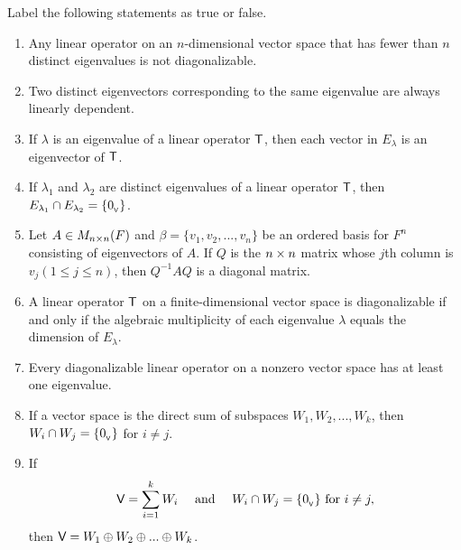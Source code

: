 \exercisesection

\begin{exercise} \label{exercise 5.2.1}
Label the following statements as true or false.
\begin{enumerate}
\item Any linear operator on an \(n\)-dimensional vector space that has fewer than \(n\) distinct eigenvalues is not diagonalizable.
\item Two distinct eigenvectors corresponding to the same eigenvalue are always linearly dependent.
\item If \(\lambda\) is an eigenvalue of a linear operator \(\textsf{T}\), then each vector in \(E_{\lambda}\) is an eigenvector of \(\textsf{T}\).
\item If \(\lambda_1\) and \(\lambda_2\) are distinct eigenvalues of a linear operator \(\textsf{T}\), then \(E_{\lambda_1} \cap E_{\lambda_2} = \{ 0_{_{\textsf{V}}} \}\).
\item Let \(A \in M_{n \times n}(F)\) and \(\beta = \{ v_1, v_2, ..., v_n \}\) be an ordered basis for \(F^n\) consisting of eigenvectors of \(A\).
If \(Q\) is the \(n \times n\) matrix whose \(j\)th column is \(v_j (1 \le j \le n)\), then \(Q^{-1} A Q\) is a diagonal matrix.
\item A linear operator \(\textsf{T}\) on a finite-dimensional vector space is diagonalizable if and only if the algebraic multiplicity of each eigenvalue \(\lambda\) equals the dimension of \(E_{\lambda}\).
\item Every diagonalizable linear operator on a nonzero vector space has at least one eigenvalue.
\item If a vector space is the direct sum of subspaces \(W_1, W_2, ..., W_k\), then \(W_i \cap W_j = \{ 0_{_{\textsf{V}}} \}\) for \(i \ne j\).

\item If
\[
    \textsf{V} = \sum_{i = 1}^k W_i \quad \text{ and } \quad W_i \cap W_j = \{ 0_{_{\textsf{V}}} \} \text{ for } i \ne j,
\]
then \(\textsf{V} = W_1 \oplus W_2 \oplus ... \oplus W_k\).
\end{enumerate}
\end{exercise}

